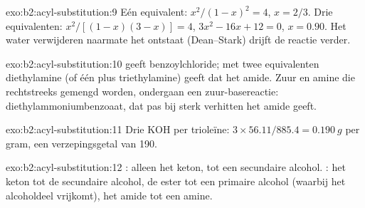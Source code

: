 \begin{solution}{exo:b2:acyl-substitution:9}
Eén equivalent: $x^2/(1 - x)^2 = 4$, $x = 2/3$. Drie equivalenten: $x^2/[(1 - x)(3 - x)] = 4$, $3x^2 - 16x
+ 12 = 0$, $x = 0.90$. Het water verwijderen naarmate het ontstaat (Dean--Stark) drijft de reactie verder.
\end{solution}

\begin{solution}{exo:b2:acyl-substitution:10}
 geeft benzoylchloride; met twee equivalenten diethylamine (of één plus triethylamine)
geeft dat het amide. Zuur en amine die rechtstreeks gemengd worden, ondergaan een zuur-basereactie: diethylammoniumbenzoaat,
dat pas bij sterk verhitten het amide geeft.
\end{solution}

\begin{solution}{exo:b2:acyl-substitution:11}
Drie KOH per trioleïne: $3 \times 56.11/885.4 = \qty{0.190}{g}$ per gram, een verzepingsgetal van
190.
\end{solution}

\begin{solution}{exo:b2:acyl-substitution:12}
: alleen het keton, tot een secundaire alcohol. : het keton tot de secundaire
alcohol, de ester tot een primaire alcohol (waarbij het alcoholdeel vrijkomt), het amide tot een amine.
\end{solution}

